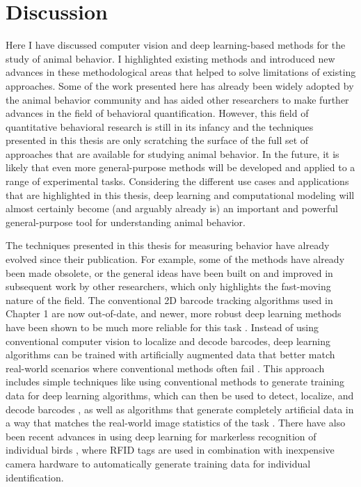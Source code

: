 \chapter*{Discussion}
Here I have discussed computer vision and deep learning-based methods for the study of animal behavior. I highlighted existing methods and introduced new advances in these methodological areas that helped to solve limitations of existing approaches. Some of the work presented here has already been widely adopted by the animal behavior community and has aided other researchers to make further advances in the field of behavioral quantification. However, this field of quantitative behavioral research is still in its infancy and the techniques presented in this thesis are only scratching the surface of the full set of approaches that are available for studying animal behavior. In the future, it is likely that even more general-purpose methods will be developed and applied to a range of experimental tasks. Considering the different use cases and applications that are highlighted in this thesis, deep learning and computational modeling will almost certainly become (and arguably already is) an important and powerful general-purpose tool for understanding animal behavior. 

The techniques presented in this thesis for measuring behavior have already evolved since their publication. For example, some of the methods have already been made obsolete, or the general ideas have been built on and improved in subsequent work by other researchers, which only highlights the fast-moving nature of the field. The conventional 2D barcode tracking algorithms used in Chapter 1 are now out-of-date, and newer, more robust deep learning methods have been shown to be much more reliable for this task \citep{wild2018honeybee, boenisch2018tracking, sixt2018rendergan, hu2019deep}. Instead of using conventional computer vision to localize and decode barcodes, deep learning algorithms can be trained with artificially augmented data that better match real-world scenarios where conventional methods often fail \citep{sixt2018rendergan}. This approach includes simple techniques like using conventional methods to generate training data for deep learning algorithms, which can then be used to detect, localize, and decode barcodes \citep{hu2019deep}, as well as algorithms that generate completely artificial data in a way that matches the real-world image statistics of the task \citep{sixt2018rendergan}. There have also been recent advances in using deep learning for markerless recognition of individual birds \citep{ferreira2019deep}, where RFID tags are used in combination with inexpensive camera hardware to automatically generate training data for individual identification.

